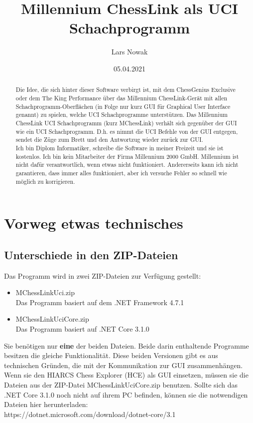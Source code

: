 \documentclass[11pt,a4paper]{article}
\title{Millennium ChessLink als UCI Schachprogramm}
\author{Lars Nowak}
\date{05.04.2021}
\begin{document}
\maketitle

\begin{abstract}
Die Idee, die sich hinter dieser Software verbirgt ist, mit dem ChessGenius Exclusive oder dem The King Performance über das Millennium ChessLink-Gerät mit allen Schachprogramm-Oberflächen (in Folge nur kurz GUI
für Graphical User Interface genannt) zu spielen, welche UCI Schachprogramme unterstützen.
Das Millennium ChessLink UCI Schachprogramm (kurz MChessLink) verhält sich gegenüber der GUI wie ein UCI Schachprogramm. D.h. es nimmt die UCI Befehle von der GUI entgegen, sendet die Züge zum Brett und den Antwortzug wieder zurück zur GUI.\\

Ich bin Diplom Informatiker, schreibe die Software in meiner Freizeit und sie ist kostenlos. Ich bin
kein Mitarbeiter der Firma Millennium 2000 GmbH. Millennium ist nicht dafür verantwortlich,
wenn etwas nicht funktioniert. Andererseits kann ich nicht garantieren, dass immer alles funktioniert,
aber ich versuche Fehler so schnell wie möglich zu korrigieren.

\end{abstract}

\newpage
\tableofcontents
\newpage

\section{Vorweg etwas technisches}

\subsection{Unterschiede in den ZIP-Dateien}
Das Programm wird in zwei ZIP-Dateien zur Verfügung gestellt:
\begin{itemize}
\item MChessLinkUci.zip\\
Das Programm basiert auf dem .NET Framework 4.7.1
\item MChessLinkUciCore.zip\\
Das Programm basiert auf .NET Core 3.1.0
\end{itemize}
Sie benötigen nur \textbf{eine} der beiden Dateien. Beide darin enthaltende Programme besitzen die gleiche Funktionalität. Diese beiden Versionen gibt es aus technischen Gründen, die mit der Kommunikation zur GUI zusammenhängen. Wenn sie den HIARCS Chess Explorer (HCE) als GUI einsetzen, müssen sie die
Dateien aus der ZIP-Datei MChessLinkUciCore.zip benutzen.
Sollte sich das .NET Core 3.1.0 noch nicht auf ihrem PC befinden, können sie die notwendigen
Dateien hier herunterladen:
\\ https://dotnet.microsoft.com/download/dotnet-core/3.1
\end{document}
